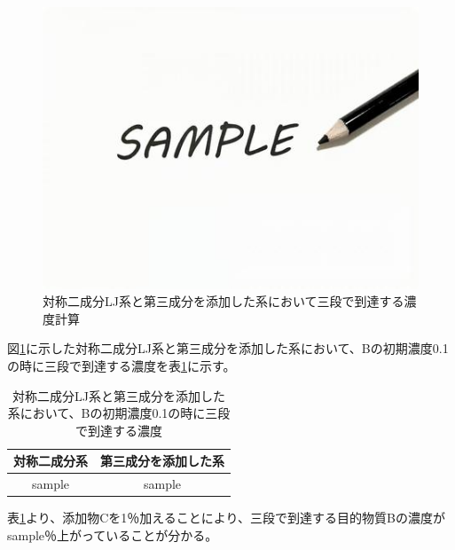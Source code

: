 \documentclass[titlepage]{jsreport}
\begin{document}
\begin{figure}[htbp]
    \begin{center}
        \includegraphics[width=14cm]{fig/sample.jpeg}
    \end{center}
    \caption{対称二成分LJ系と第三成分を添加した系において三段で到達する濃度計算}
    \label{fig:bi-component-addition-of-3rd-component-steps}
\end{figure}

\newpage
図\ref{fig:bi-component-addition-of-3rd-component-steps}に示した対称二成分LJ系と第三成分を添加した系において、Bの初期濃度0.1の時に三段で到達する濃度を表\ref{table:bi-component-addition-of-3rd-component-steps}に示す。


\begin{table}[htbp]
    \begin{center}
        \caption{対称二成分LJ系と第三成分を添加した系において、Bの初期濃度0.1の時に三段で到達する濃度}
        \label{table:bi-component-addition-of-3rd-component-steps}
        \begin{tabular}{c c}
            対称二成分系 & 第三成分を添加した系 \\
            \hline
            sample & sample \\
        \end{tabular}
    \end{center}
\end{table}

表\ref{table:bi-component-addition-of-3rd-component-steps}より、添加物Cを1％加えることにより、三段で到達する目的物質Bの濃度がsample％上がっていることが分かる。
\end{document}

